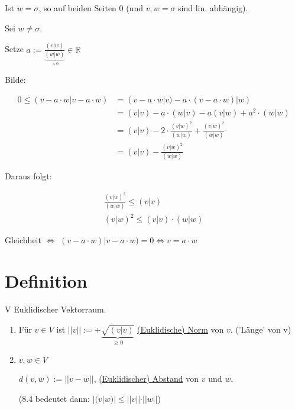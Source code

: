 \documentclass[a4paper, openany]{book}
\begin{document}
        Ist $w = \sigma$, so auf beiden Seiten 0 (und $v, w = \sigma$ sind lin. abhängig).

        \par \medskip

        Sei $w \neq \sigma$.

        Setze $a := \frac{(v|w)}{\underbrace{(w|w)}_{> 0}} \in \mathbb{R}$

        Bilde:

        \begin{align*}
          0 \le (v-a \cdot w | v - a \cdot w) & = (v-a \cdot w | v) - a \cdot (v- a \cdot w) |w) \\
                                              & = (v|v) - a \cdot (w|v) - a(v|w) + a^2 \cdot (w|w)  \\
                                              & = (v|v) - 2 \cdot \frac{(v|w)^2}{(w|w)} + \frac{(v|w)^2}{(w|w)} \\
                                              & = (v|v) - \frac{(v|w)^2}{(w|w)}
        \end{align*}
        
        Daraus folgt:

        \begin{align*}
          \frac{(v|w)^2}{(w|w)} \le (v|v) \\
          (v|w)^2 \le (v|v) \cdot (w|w)
        \end{align*}

        Gleichheit $\Leftrightarrow$ $(v-a \cdot w) | v - a \cdot w) = 0 \Leftrightarrow v = a \cdot w$

        \section{Definition}

        V Euklidischer Vektorraum.

        \begin{enumerate}[label=(\alph*)]
          \item Für $v \in V$ ist $||v|| := + \underbrace{\sqrt{(v|v)}}_{\ge 0}$ \underline{(Euklidische) Norm} von $v.$ ('Länge' von v)

          \item $v,w \in V$

          $d(v,w) := ||v-w||$, \underline{(Euklidischer) Abstand} von $v$ und $w$.

          (8.4 bedeutet dann: $|(v|w)| \le ||v|| \cdot ||w||$)
        \end{enumerate}
\end{document}
